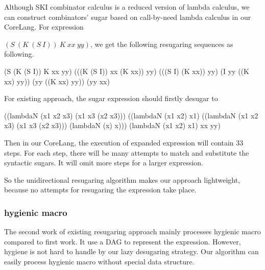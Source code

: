 Although SKI combinator calculus is a reduced version of lambda calculus, we can construct combinators' sugar based on call-by-need lambda calculus in our CoreLang. For expression

 $(S~(K~(S~I))~K~xx~yy)$, we get the following resugaring sequences as following.
\begin{Codes}
    (S (K (S I)) K xx yy)
\OneStep (((K (S I)) xx (K xx)) yy)
\OneStep (((S I) (K xx)) yy)
\OneStep (I yy ((K xx) yy))
\OneStep (yy ((K xx) yy))
\OneStep (yy xx)
\end{Codes}


For existing approach, the sugar expression should firstly desugar to
\begin{Codes}
((lambdaN
   (x1 x2 x3)
   (x1 x3 (x2 x3)))
  ((lambdaN (x1 x2) x1)
   ((lambdaN
     (x1 x2 x3)
     (x1 x3 (x2 x3)))
    (lambdaN (x) x)))
  (lambdaN (x1 x2) x1)
  xx yy)
\end{Codes}

Then in our CoreLang, the execution of expanded expression will contain 33 steps. For each step, there will be many attempts to match and substitute the syntactic sugars. It will omit more steps for a larger expression.

So the unidirectional resugaring algorithm makes our approach lightweight, because no attempts for resugaring the expression take place.
\subsubsection{hygienic macro}
\label{mark:hygienic}


The second work\cite{hygienic} of existing resugaring approach mainly processes hygienic macro compared to first work. It use a DAG to represent the expression. However, hygiene is not hard to handle by our lazy desugaring strategy. Our algorithm can easily process hygienic macro without special data structure. 





